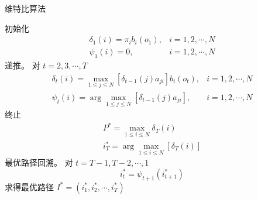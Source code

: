 \begin{algorithm}
\caption{维特比算法}


    初始化
\begin{equation}
\begin{array}{cc}
\delta_{1}(i)=\pi_{i} b_{i}\left(o_{1}\right), & i=1,2, \cdots, N \\
\psi_{1}(i)=0, & i=1,2, \cdots, N
\end{array}
\end{equation}\;
递推。 对 $ t=2,3, \cdots, T $
\begin{equation}
\begin{array}{ll}
\delta_{t}(i)=\max _{1 \leqslant j \leqslant N}\left[\delta_{t-1}(j) a_{j i}\right] b_{i}\left(o_{t}\right), & i=1,2, \cdots, N \\
\psi_{t}(i)=\arg \max _{1 \leqslant j \leqslant N}\left[\delta_{t-1}(j) a_{j i}\right], & i=1,2, \cdots, N
\end{array}
\end{equation}\;
终止
\begin{equation}
\begin{array}{c}
P^{*}=\max _{1 \leqslant i \leqslant N} \delta_{T}(i) \\
i_{T}^{*}=\arg \max _{1 \leqslant i \leqslant N}\left[\delta_{T}(i)\right]
\end{array}
\end{equation}\;
最优路径回溯。 对 $ t=T-1, T-2, \cdots, 1 $
\begin{equation}
i_{t}^{*}=\psi_{t+1}\left(i_{t+1}^{*}\right)
\end{equation}
求得最优路径 $ I^{*}=\left(i_{1}^{*}, i_{2}^{*}, \cdots, i_{T}^{*}\right) $
\;

\end{algorithm}{}